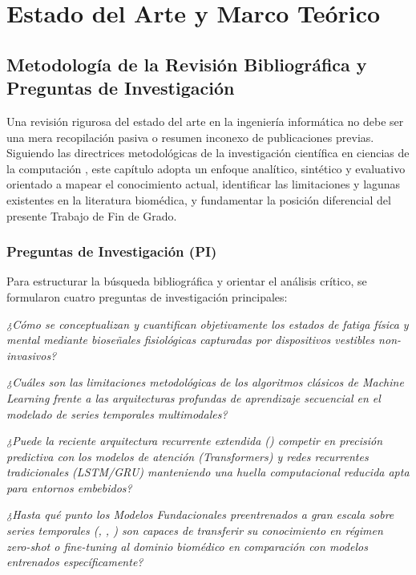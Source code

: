 
\chapter{Estado del Arte y Marco Teórico}
\label{cap:estado_del_arte}

\section{Metodología de la Revisión Bibliográfica y Preguntas de Investigación}
\label{sec:teoria_metodologia}

Una revisión rigurosa del estado del arte en la ingeniería informática no debe ser una mera recopilación pasiva o resumen inconexo de publicaciones previas. Siguiendo las directrices metodológicas de la investigación científica en ciencias de la computación \cite{guillen2025libro}, este capítulo adopta un enfoque analítico, sintético y evaluativo orientado a mapear el conocimiento actual, identificar las limitaciones y lagunas existentes en la literatura biomédica, y fundamentar la posición diferencial del presente Trabajo de Fin de Grado.

\subsection{Preguntas de Investigación (PI)}

Para estructurar la búsqueda bibliográfica y orientar el análisis crítico, se formularon cuatro preguntas de investigación principales:
\begin{description}[font=\bfseries, leftmargin=1.2cm]
    \item[PI1:] \textit{¿Cómo se conceptualizan y cuantifican objetivamente los estados de fatiga física y mental mediante bioseñales fisiológicas capturadas por dispositivos vestibles non-invasivos?}
    \item[PI2:] \textit{¿Cuáles son las limitaciones metodológicas de los algoritmos clásicos de Machine Learning frente a las arquitecturas profundas de aprendizaje secuencial en el modelado de series temporales multimodales?}
    \item[PI3:] \textit{¿Puede la reciente arquitectura recurrente extendida (\xlstm{}) competir en precisión predictiva con los modelos de atención (Transformers) y redes recurrentes tradicionales (LSTM/GRU) manteniendo una huella computacional reducida apta para entornos embebidos?}
    \item[PI4:] \textit{¿Hasta qué punto los Modelos Fundacionales preentrenados a gran escala sobre series temporales (\moment{}, \chronos{}, \timesfm{}) son capaces de transferir su conocimiento en régimen zero-shot o fine-tuning al dominio biomédico en comparación con modelos entrenados específicamente?}
\end{description}

